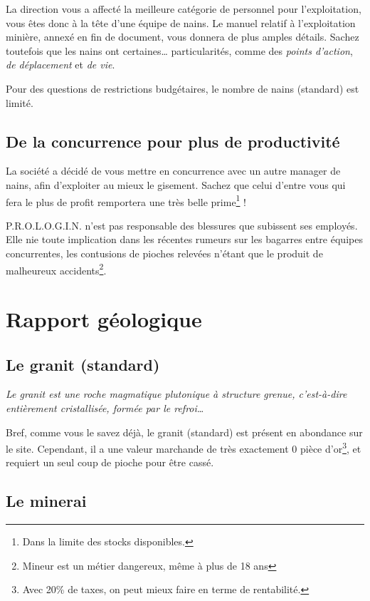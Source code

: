   La direction vous a affecté la meilleure catégorie de personnel pour
  l'exploitation, vous êtes donc à la tête d'une équipe de nains. Le manuel
  relatif à l'exploitation minière, annexé en fin de document, vous donnera de
  plus amples détails. Sachez toutefois que les nains ont certaines\ldots{}
  particularités, comme des \textit{points d'action}, \textit{de déplacement}
  et \textit{de vie}.

  Pour des questions de restrictions budgétaires, le nombre de nains
  (standard) est limité.

\subsection{De la concurrence pour plus de productivité}

  La société a décidé de vous mettre en concurrence avec un autre manager de
  nains, afin d'exploiter au mieux le gisement. Sachez que celui d'entre vous
  qui fera le plus de profit remportera une très belle prime\footnote{Dans la
  limite des stocks disponibles.} !

  P.R.O.L.O.G.I.N. n'est pas responsable des blessures que subissent ses
  employés. Elle nie toute implication dans les récentes rumeurs sur les
  bagarres entre équipes concurrentes, les contusions de pioches relevées
  n'étant que le produit de malheureux accidents\footnote{Mineur est un métier
  dangereux, même à plus de 18 ans}.

\newpage

\section{Rapport géologique}

\subsection{Le granit (standard)}

  \textit{Le granit est une roche magmatique plutonique à structure grenue,
  c'est-à-dire entièrement cristallisée, formée par le refroi\ldots{}}

  Bref, comme vous le savez déjà, le granit (standard) est présent en abondance
  sur le site. Cependant, il a une valeur marchande de très exactement 0 pièce
  d'or\footnote{Avec 20\% de taxes, on peut mieux faire en terme de
  rentabilité.}, et requiert un seul coup de pioche pour être cassé.

\subsection{Le minerai}

